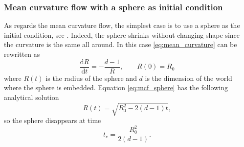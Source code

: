 \documentclass[a4paper,11pt, onecolumn]{article}
\begin{document}
\subsubsection{Mean curvature flow with a sphere as initial condition}

As regards the mean curvature flow, the simplest case is to use a sphere as the
initial condition, see \cite{Ilmanen98}. Indeed, the sphere shrinks without
changing shape since the curvature is the same all around. In this case
\eqref{eq:mean_curvature} can be rewritten as
\begin{equation}\label{eq:mcf_sphere}
 \frac{\mathrm{d}R}{\mathrm{d}t}=-\frac{d-1}{R},\qquad R(0)=R_0
\end{equation}
where $R(t)$ is the radius of the sphere and $d$ is the dimension of the world
where the sphere is embedded. Equation \eqref{eq:mcf_sphere} has the following
analytical solution
\begin{equation}\label{eq:mcf_sphere_solution}
 R(t)=\sqrt{R_0^2-2(d-1)t},
\end{equation}
so the sphere disappears at time
\begin{equation}\label{eq:extinction_time}
 t_{e}=\frac{R_0^2}{2(d-1)}.
\end{equation}
\end{document}
